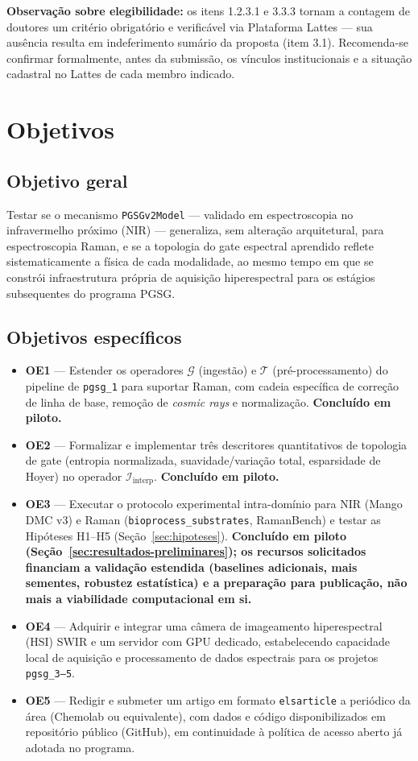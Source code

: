 \documentclass[11pt,a4paper]{article}
\begin{document}
\noindent\textbf{Observação sobre elegibilidade:} os itens 1.2.3.1 e 3.3.3 tornam a contagem de doutores um critério obrigatório e verificável via Plataforma Lattes --- sua ausência resulta em indeferimento sumário da proposta (item 3.1). Recomenda-se confirmar formalmente, antes da submissão, os vínculos institucionais e a situação cadastral no Lattes de cada membro indicado.

\section{Objetivos}

\subsection{Objetivo geral}
Testar se o mecanismo \texttt{PGSGv2Model} --- validado em espectroscopia no infravermelho próximo (NIR) --- generaliza, sem alteração arquitetural, para espectroscopia Raman, e se a topologia do gate espectral aprendido reflete sistematicamente a física de cada modalidade, ao mesmo tempo em que se constrói infraestrutura própria de aquisição hiperespectral para os estágios subsequentes do programa PGSG.

\subsection{Objetivos específicos}
\begin{itemize}
\item \textbf{OE1} --- Estender os operadores $\mathcal{G}$ (ingestão) e $\mathcal{T}$ (pré-processamento) do pipeline de \texttt{pgsg\_1} para suportar Raman, com cadeia específica de correção de linha de base, remoção de \emph{cosmic rays} e normalização. \textbf{Concluído em piloto.}
\item \textbf{OE2} --- Formalizar e implementar três descritores quantitativos de topologia de gate (entropia normalizada, suavidade/variação total, esparsidade de Hoyer) no operador $\mathcal{I}_{\text{interp}}$. \textbf{Concluído em piloto.}
\item \textbf{OE3} --- Executar o protocolo experimental intra-domínio para NIR (Mango DMC v3) e Raman (\texttt{bioprocess\_substrates}, RamanBench) e testar as Hipóteses H1--H5 (Seção~\ref{sec:hipoteses}). \textbf{Concluído em piloto (Seção~\ref{sec:resultados-preliminares}); os recursos solicitados financiam a validação estendida (baselines adicionais, mais sementes, robustez estatística) e a preparação para publicação, não mais a viabilidade computacional em si.}
\item \textbf{OE4} --- Adquirir e integrar uma câmera de imageamento hiperespectral (HSI) SWIR e um servidor com GPU dedicado, estabelecendo capacidade local de aquisição e processamento de dados espectrais para os projetos \texttt{pgsg\_3--5}.
\item \textbf{OE5} --- Redigir e submeter um artigo em formato \texttt{elsarticle} a periódico da área (Chemolab ou equivalente), com dados e código disponibilizados em repositório público (GitHub), em continuidade à política de acesso aberto já adotada no programa.
\end{itemize}
\end{document}
